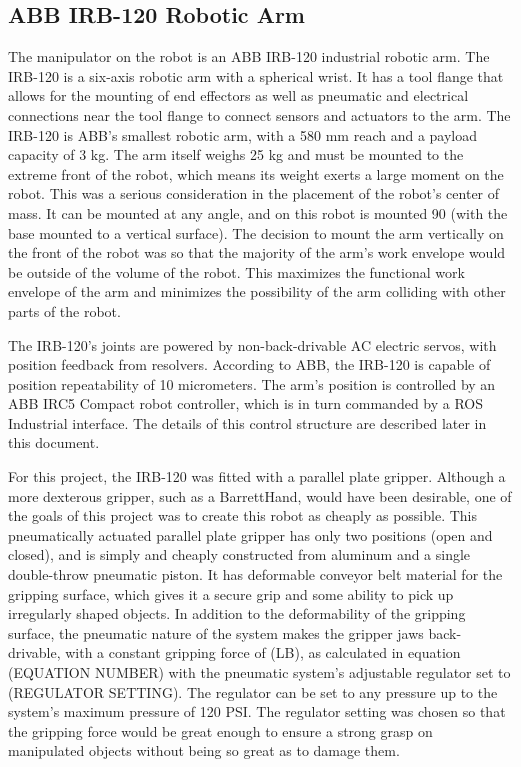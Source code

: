 \documentclass{cwru}
\begin{document}
\subsection[ABB IRB{}-120 Robotic Arm]{ABB IRB-120 Robotic Arm}
The manipulator on the robot is an ABB IRB-120 industrial robotic arm. The IRB-120 is a six-axis robotic arm with a spherical wrist. It has a tool flange that allows for the mounting of end effectors as well as pneumatic and electrical connections near the tool flange to connect sensors and actuators to the arm. The IRB-120 is ABB{\textquoteright}s smallest robotic arm, with a 580 mm reach and a payload capacity of 3 kg. The arm itself weighs 25 kg and must be mounted to the extreme front of the robot, which means its weight exerts a large moment on the robot. This was a serious consideration in the placement of the robot{\textquoteright}s center of mass. It can be mounted at any angle, and on this robot is mounted 90{\textdegree} (with the base mounted to a vertical surface). The decision to mount the arm vertically on the front of the robot was so that the majority of the arm{\textquoteright}s work envelope would be outside of the volume of the robot. This maximizes the functional work envelope of the arm and minimizes the possibility of the arm colliding with other parts of the robot.

The IRB-120{\textquoteright}s joints are powered by non-back-drivable AC electric servos, with position feedback from resolvers. According to ABB, the IRB-120 is capable of position repeatability of 10 micrometers. The arm{\textquoteright}s position is controlled by an ABB IRC5 Compact robot controller, which is in turn commanded by a ROS Industrial interface. The details of this control structure are described later in this document.

For this project, the IRB-120 was fitted with a parallel plate gripper. Although a more dexterous gripper, such as a BarrettHand, would have been desirable, one of the goals of this project was to create this robot as cheaply as possible. This pneumatically actuated parallel plate gripper has only two positions (open and closed), and is simply and cheaply constructed from aluminum and a single double-throw pneumatic piston. It has deformable conveyor belt material for the gripping surface, which gives it a secure grip and some ability to pick up irregularly shaped objects. In addition to the deformability of the gripping surface, the pneumatic nature of the system makes the gripper jaws back-drivable, with a constant gripping force of (LB), as calculated in equation (EQUATION NUMBER) with the pneumatic system{\textquoteright}s adjustable regulator set to (REGULATOR SETTING). The regulator can be set to any pressure up to the system{\textquoteright}s maximum pressure of 120 PSI. The regulator setting was chosen so that the gripping force would be great enough to ensure a strong grasp on manipulated objects without being so great as to damage them.
\end{document}
